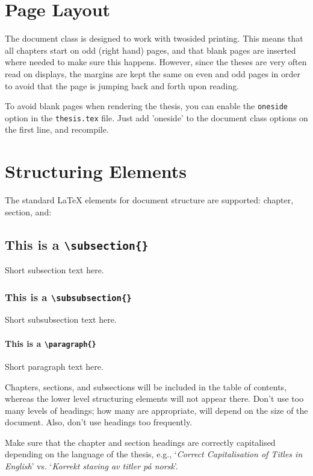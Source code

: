 {{\section{Page Layout}

The document class is designed to work with twosided printing. This means that all chapters start on odd (right hand) pages, and that blank pages are inserted where needed to make sure this happens. However, since the theses are very often read on displays, the margins are kept the same on even and odd pages in order to avoid that the page is jumping back and forth upon reading.

To avoid blank pages when rendering the thesis, you can enable the \texttt{oneside} option in the \texttt{thesis.tex} file. Just add 'oneside' to the document class options on the first line, and recompile.

\section{Structuring Elements}

The standard \LaTeX{} elements for document structure are supported: chapter, section, and:

\subsection{This is a \texttt{\textbackslash subsection\{\}}}

Short subsection text here.

\subsubsection{This is a \texttt{\textbackslash subsubsection\{\}}}

Short subsubsection text here.

\paragraph{This is a \texttt{\textbackslash paragraph\{\}}}

Short paragraph text here.

Chapters, sections, and subsections will be included in the table of contents, whereas the lower level structuring elements will not appear there. Don't use too many levels of headings; how many are appropriate, will depend on the size of the document. Also, don't use headings too frequently.

Make sure that the chapter and section headings are correctly capitalised depending on the language of the thesis, e.g., `\emph{Correct Capitalisation of Titles in English}' vs. `\emph{Korrekt staving av titler på norsk}'.

}}
